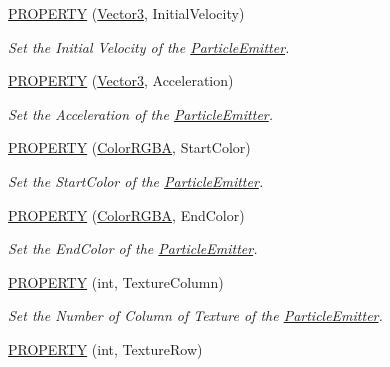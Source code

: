 \begin{DoxyCompactItemize}
\hyperlink{class_i_dream_sky_1_1_particle_emitter_a82ebfdf8081d1fc94b5922275586686d}{P\+R\+O\+P\+E\+R\+TY} (\hyperlink{class_i_dream_sky_1_1_vector3}{Vector3}, Initial\+Velocity)
\begin{DoxyCompactList}\small\item\em Set the Initial Velocity of the \hyperlink{class_i_dream_sky_1_1_particle_emitter}{Particle\+Emitter}. \end{DoxyCompactList}\item 
\hyperlink{class_i_dream_sky_1_1_particle_emitter_aacfc511a6766f6e492d60f3bcb80a416}{P\+R\+O\+P\+E\+R\+TY} (\hyperlink{class_i_dream_sky_1_1_vector3}{Vector3}, Acceleration)
\begin{DoxyCompactList}\small\item\em Set the Acceleration of the \hyperlink{class_i_dream_sky_1_1_particle_emitter}{Particle\+Emitter}. \end{DoxyCompactList}\item 
\hyperlink{class_i_dream_sky_1_1_particle_emitter_afaedcf0169cbee60a20c85c9dc9a3f68}{P\+R\+O\+P\+E\+R\+TY} (\hyperlink{class_i_dream_sky_1_1_color_r_g_b_a}{Color\+R\+G\+BA}, Start\+Color)
\begin{DoxyCompactList}\small\item\em Set the Start\+Color of the \hyperlink{class_i_dream_sky_1_1_particle_emitter}{Particle\+Emitter}. \end{DoxyCompactList}\item 
\hyperlink{class_i_dream_sky_1_1_particle_emitter_aed419bc8b176a75333cb9f2482069110}{P\+R\+O\+P\+E\+R\+TY} (\hyperlink{class_i_dream_sky_1_1_color_r_g_b_a}{Color\+R\+G\+BA}, End\+Color)
\begin{DoxyCompactList}\small\item\em Set the End\+Color of the \hyperlink{class_i_dream_sky_1_1_particle_emitter}{Particle\+Emitter}. \end{DoxyCompactList}\item 
\hyperlink{class_i_dream_sky_1_1_particle_emitter_a81e30ddf74a07e8b509d5c50f4ae91bb}{P\+R\+O\+P\+E\+R\+TY} (int, Texture\+Column)
\begin{DoxyCompactList}\small\item\em Set the Number of Column of Texture of the \hyperlink{class_i_dream_sky_1_1_particle_emitter}{Particle\+Emitter}. \end{DoxyCompactList}\item 
\hyperlink{class_i_dream_sky_1_1_particle_emitter_a19b6e3bb05ac25976fcd67a51dac4627}{P\+R\+O\+P\+E\+R\+TY} (int, Texture\+Row)

\end{DoxyCompactItemize}
